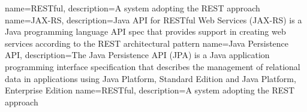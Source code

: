 {
  name={RESTful},
  description={A system adopting the REST approach}
}
{
  name={JAX-RS},
  description={Java API for RESTful Web Services (JAX-RS)  is a Java programming language API spec that provides support in creating web services according to the REST architectural pattern}
}
{
  name={Java Persistence API},
  description={The Java Persistence API (JPA) is a Java application programming interface specification that describes the management of relational data in applications using Java Platform, Standard Edition and Java Platform, Enterprise Edition}
}
{
  name={RESTful},
  description={A system adopting the REST approach}
}


